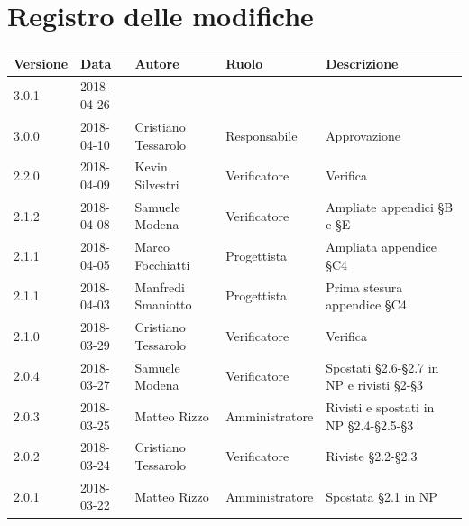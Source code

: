 \documentclass[openany,12pt,a4paper]{report}
\begin{document}
\chapter*{Registro delle modifiche}
\setlength\LTleft{-22mm}
\begin{longtable}{|p{20mm}|p{20mm}|p{40mm}|p{30mm}|p{50mm}|}
	\hline
	\textbf{Versione} & \textbf{Data} & \textbf{Autore} & \textbf{Ruolo} & \textbf{Descrizione} \\
		
		
		\hline 3.0.1 & 2018-04-26 &  &  &  \\
		\hline 3.0.0 & 2018-04-10 & Cristiano Tessarolo & Responsabile & Approvazione \\
		\hline 2.2.0 & 2018-04-09 & Kevin Silvestri & Verificatore & Verifica \\
		\hline 2.1.2 & 2018-04-08 & Samuele Modena & Verificatore & Ampliate appendici §B e §E \\
		\hline 2.1.1 & 2018-04-05 & Marco Focchiatti & Progettista & Ampliata appendice §C4 \\
		\hline 2.1.1 & 2018-04-03 & Manfredi Smaniotto & Progettista & Prima stesura appendice §C4  \\
		\hline 2.1.0 & 2018-03-29 & Cristiano Tessarolo & Verificatore & Verifica \\
		\hline 2.0.4 & 2018-03-27 & Samuele Modena & Verificatore & Spostati §2.6-§2.7 in NP e rivisti §2-§3 \\
		\hline 2.0.3 & 2018-03-25 & Matteo Rizzo & Amministratore & Rivisti e spostati in NP §2.4-§2.5-§3  \\
		\hline 2.0.2 & 2018-03-24 & Cristiano Tessarolo & Verificatore & Riviste §2.2-§2.3 \\
		\hline 2.0.1 & 2018-03-22 & Matteo Rizzo & Amministratore & Spostata §2.1 in NP \\
		
		\hline
		

\end{longtable}
\end{document}
